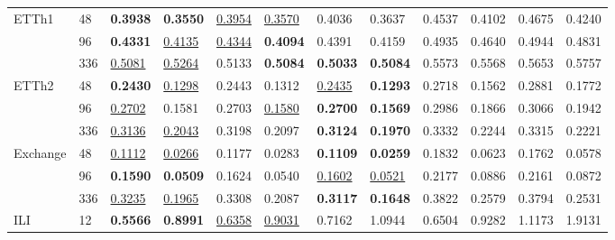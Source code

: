 \begin{small}
\begin{table}
{\begin{tabular}{p{10mm}p{8mm}p{8mm}p{8mm}p{8mm}p{8mm}p{8mm}p{8mm}p{8mm}p{8mm}p{8mm}p{8mm}}
\multirow{3}{*}{ETTh1}   & 48     & \textbf{0.3938} 	 & \textbf{0.3550}          & \underline{0.3954}       & \underline{0.3570}         & 0.4036    & 0.3637    & 0.4537 & 0.4102 & 0.4675       & 0.4240         \\
                             & 96     & \textbf{0.4331 }         & \underline{0.4135}    & \underline{0.4344}          & \textbf{0.4094}          & 0.4391    & 0.4159    & 0.4935    & 0.4640 & 0.4944         & 0.4831  \\
                             & 336     & \underline{0.5081} 	& \underline{0.5264}    & 0.5133         & \textbf{0.5084}        & \textbf{0.5033 }   & \textbf{0.5084}   & 0.5573          & 0.5568 & 0.5653    & 0.5757    \\
\midrule
\multirow{3}{*}{ETTh2}   & 48     & \textbf{0.2430}          & \underline{0.1298}          & 0.2443         & 0.1312   & \underline{0.2435 }  & \textbf{0.1293}    & 0.2718          & 0.1562          & 0.2881          & 0.1772         \\
                             & 96     & \underline{0.2702}          & 0.1581          & 0.2703    & \underline{0.1580}   & \textbf{0.2700}        & \textbf{0.1569}        & 0.2986        & 0.1866      & 0.3066          & 0.1942        \\
                             & 336     & \underline{0.3136}        & \underline{0.2043}         & 0.3198    & 0.2097   & \textbf{0.3124}  & \textbf{0.1970}   & 0.3332        & 0.2244      & 0.3315       & 0.2221          \\
\midrule
\multirow{3}{*}{Exchange} & 48     & \underline{0.1112}   & \underline{0.0266}      & 0.1177       & 0.0283      & \textbf{0.1109}      & \textbf{0.0259}         & 0.1832        & 0.0623         & 0.1762       & 0.0578  \\
                             & 96     & \textbf{0.1590}  & \textbf{0.0509}          & 0.1624        & 0.0540        & \underline{0.1602}         & \underline{0.0521}        & 0.2177          & 0.0886         & 0.2161 & 0.0872\\
                             & 336     & \underline{0.3235}  & \underline{0.1965}         & 0.3308        & 0.2087        & \textbf{0.3117}         & \textbf{0.1648}        & 0.3822           & 0.2579         & 0.3794          & 0.2531        \\
\midrule
\multirow{3}{*}{ILI}     & 12     & \textbf{0.5566} & \textbf{0.8991} & \underline{0.6358} & \underline{0.9031} & 0.7162     & 1.0944     & 0.6504  & 0.9282   & 1.1173  & 1.9131  \\

\end{tabular}}
\end{table}
\end{small}
